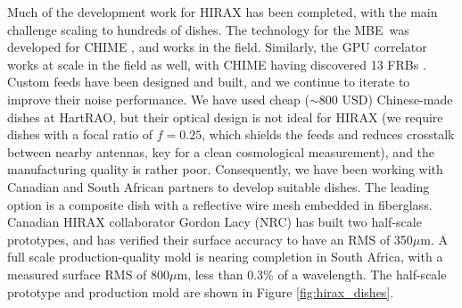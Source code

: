 \documentclass[letterpaper,11pt,preprint]{aastex}
\newcommand{\mbe}{{\rm MBE}}
\begin{document}

Much of the development work for HIRAX has been completed, with the
main challenge scaling to hundreds of dishes.  The technology for the
\mbe\ was developed for CHIME \citep{Bandura16}, and works in the
field.  Similarly, the GPU correlator \citep{Recnik15} 
works at scale in the field as well, with CHIME having discovered 13
FRBs \citep{chime_frbs}.  Custom feeds
have been designed and built, and we continue to iterate to improve
their noise performance.
We have used cheap ($\sim$800 USD) Chinese-made dishes at HartRAO, but
their optical design is not ideal for HIRAX (we require dishes with a
focal ratio of $f=0.25$, which shields the feeds and reduces crosstalk
between nearby antennas, key for a clean cosmological measurement),
and the manufacturing quality is rather poor.  Consequently, we have
been working with Canadian and South African partners to develop
suitable dishes.  The leading option is a composite dish with a reflective
wire mesh embedded in fiberglass.  Canadian HIRAX collaborator Gordon
Lacy (NRC) has built two half-scale prototypes, and has verified their
surface accuracy to have an RMS of 350$\mu$m.  A full scale
production-quality mold is nearing completion in South Africa, with a
measured surface RMS of 800$\mu$m, less than 0.3\% of a wavelength.
The half-scale prototype and production mold are shown in Figure
\ref{fig:hirax_dishes}. 
\end{document}
